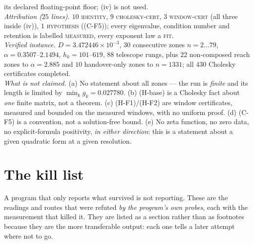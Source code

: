 \documentclass[11pt,a4paper]{article}
\begin{document}
\begin{keybox}
its declared floating-point floor; (iv) is not used.\\[3pt]
\emph{Attribution ($25$ lines).} $10$ \textsc{identity}, $9$ \textsc{cholesky-cert}, $3$
\textsc{window-cert} (all three inside (iv)), $1$ \textsc{hypothesis} ((C-F5)); every eigenvalue,
condition number and retention is labelled \textsc{measured}, every exponent law a \textsc{fit}.\\[3pt]
\emph{Verified instance.} $D=3.472446\times10^{-3}$, $30$ consecutive zones $n=2\ldots79$,
$\alpha=0.3507$--$2.1494$, $h_k=101$--$619$, $88$ telescope rungs, plus $22$ non-composed reach zones
to $\alpha=2.885$ and $10$ handover-only zones to $n=1331$; all $430$ Cholesky certificates
completed.\\[3pt]
\emph{What is not claimed.} (a) No statement about all zones --- the run is \emph{finite} and its
length is limited by $\min_kg_k=0.027780$. (b) (H-base) is a Cholesky fact about \emph{one} finite
matrix, not a theorem. (c) (H-F1)/(H-F2) are window certificates, measured and bounded on the
measured windows, with no uniform proof. (d) (C-F5) is a convention, not a solution-free bound.
(e) No zeta function, no zero data, no explicit-formula positivity, \emph{in either direction}:
this is a statement about a given quadratic form at a given resolution.
\end{keybox}

\section{The kill list}\label{sec:kills}
\noindent A program that only reports what survived is not reporting. These are the readings and routes
that were refuted \emph{by the program's own probes}, each with the measurement that killed it. They are
listed as a section rather than as footnotes because they are the more transferable output: each one
tells a later attempt where not to go.
\end{document}
